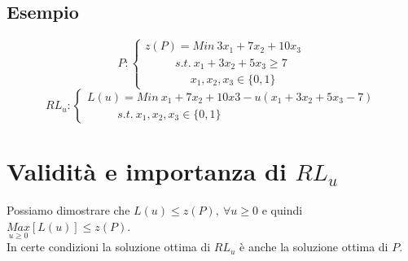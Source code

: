 \subsection{Esempio}
\begin{displaymath}
P:
\begin{cases}
z(P)=Min\ 3x_{1}+7x_{2}+10x_{3} \\
\ \ \ \ \ \ \ \ \ \ \ \ s.t.\ x_{1}+3x_{2}+5x_{3}\ge 7 \\
\ \ \ \ \ \ \ \ \ \ \ \ \ \ \ \ \ \ x_{1},x_{2},x_{3}\in\{0,1\}
\end{cases}
\end{displaymath}
\begin{displaymath}
RL_{u}:
\begin{cases}
L(u)=Min\ x_{1}+7x_{2}+10x{3}-u(x_{1}+3x_{2}+5x_{3}-7) \\
\ \ \ \ \ \ \ \ \ \ \ \ s.t.\ x_{1},x_{2},x_{3}\in\{0,1\}
\end{cases}
\end{displaymath}

\section{Validità e importanza di $RL_{u}$}
Possiamo dimostrare che $L(u)\le z(P),\ \forall u\ge0$ e quindi $\underset{u\ge 0}{Max}[L(u)]\le z(P)$.\\
In certe condizioni la soluzione ottima di $RL_{u}$ è anche la soluzione ottima di $P$.
